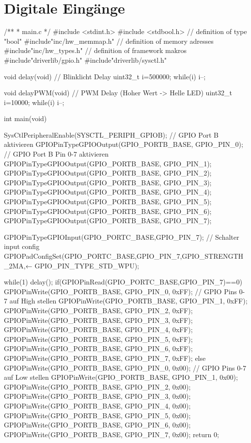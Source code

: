 \section{Digitale Eingänge}


/**
 * main.c
 */
 #include <stdint.h>
 #include <stdbool.h>                                           // definition of type "bool"
 #include"inc/hw_memmap.h"                                      // definition of memory adresses
 #include"inc/hw_types.h"                                        // definition of framework makros
 #include"driverlib/gpio.h"
 #include"driverlib/sysctl.h"

void delay(void)                                                // Blinklicht Delay
{
  uint32_t i=500000;
  while(i) {i--;}
 }

void delayPWM(void)                                             // PWM Delay (Hoher Wert -> Helle LED)
{
  uint32_t i=10000;
  while(i) {i--;}
 }


int main(void){
    SysCtlPeripheralEnable(SYSCTL_PERIPH_GPIOB);                // GPIO Port B aktivieren
    GPIOPinTypeGPIOOutput(GPIO_PORTB_BASE, GPIO_PIN_0);         // GPIO Port B Pin 0-7 aktivieren
    GPIOPinTypeGPIOOutput(GPIO_PORTB_BASE, GPIO_PIN_1);
    GPIOPinTypeGPIOOutput(GPIO_PORTB_BASE, GPIO_PIN_2);
    GPIOPinTypeGPIOOutput(GPIO_PORTB_BASE, GPIO_PIN_3);
    GPIOPinTypeGPIOOutput(GPIO_PORTB_BASE, GPIO_PIN_4);
    GPIOPinTypeGPIOOutput(GPIO_PORTB_BASE, GPIO_PIN_5);
    GPIOPinTypeGPIOOutput(GPIO_PORTB_BASE, GPIO_PIN_6);
    GPIOPinTypeGPIOOutput(GPIO_PORTB_BASE, GPIO_PIN_7);

    GPIOPinTypeGPIOInput(GPIO_PORTC_BASE,GPIO_PIN_7);           // Schalter input config
    GPIOPadConfigSet(GPIO_PORTC_BASE,GPIO_PIN_7,GPIO_STRENGTH_2MA,← GPIO_PIN_TYPE_STD_WPU);

   while(1)
   {
       delay();
       if(GPIOPinRead(GPIO_PORTC_BASE,GPIO_PIN_7)==0) {
    GPIOPinWrite(GPIO_PORTB_BASE, GPIO_PIN_0, 0xFF);            // GPIO Pins 0-7 auf High stellen
    GPIOPinWrite(GPIO_PORTB_BASE, GPIO_PIN_1, 0xFF);
    GPIOPinWrite(GPIO_PORTB_BASE, GPIO_PIN_2, 0xFF);
    GPIOPinWrite(GPIO_PORTB_BASE, GPIO_PIN_3, 0xFF);
    GPIOPinWrite(GPIO_PORTB_BASE, GPIO_PIN_4, 0xFF);
    GPIOPinWrite(GPIO_PORTB_BASE, GPIO_PIN_5, 0xFF);
    GPIOPinWrite(GPIO_PORTB_BASE, GPIO_PIN_6, 0xFF);
    GPIOPinWrite(GPIO_PORTB_BASE, GPIO_PIN_7, 0xFF);
       }
       else
       {
    GPIOPinWrite(GPIO_PORTB_BASE, GPIO_PIN_0, 0x00);            // GPIO Pins 0-7 auf Low stellen
    GPIOPinWrite(GPIO_PORTB_BASE, GPIO_PIN_1, 0x00);
    GPIOPinWrite(GPIO_PORTB_BASE, GPIO_PIN_2, 0x00);
    GPIOPinWrite(GPIO_PORTB_BASE, GPIO_PIN_3, 0x00);
    GPIOPinWrite(GPIO_PORTB_BASE, GPIO_PIN_4, 0x00);
    GPIOPinWrite(GPIO_PORTB_BASE, GPIO_PIN_5, 0x00);
    GPIOPinWrite(GPIO_PORTB_BASE, GPIO_PIN_6, 0x00);
    GPIOPinWrite(GPIO_PORTB_BASE, GPIO_PIN_7, 0x00);
       }
   }
    return 0;
}

